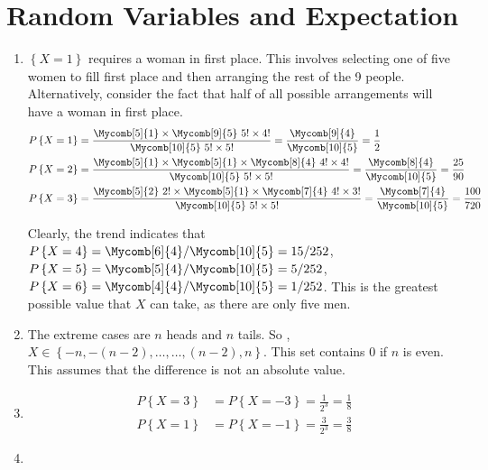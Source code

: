\chapter{Random Variables and Expectation}

\begin{enumerate}
	\item $ \left\{X = 1 \right\}$ requires a woman in first place. This involves selecting one of five women to fill first place and then arranging the rest of the 9 people. Alternatively, consider the fact that half of all possible arrangements will have a woman in first place.
	\begin{align}
		P \left\{X = 1 \right\} &= \frac{\Mycomb[5]{1} \times \Mycomb[9]{5} \ 5! \times 4!}{\Mycomb[10]{5} \ 5! \times 5!} = \frac{\Mycomb[9]{4}}{\Mycomb[10]{5}} = \frac{1}{2} \nonumber \\
		P \left\{X = 2 \right\} &= \frac{\Mycomb[5]{1} \times \Mycomb[5]{1} \times \Mycomb[8]{4}\ 4! \times 4!}{\Mycomb[10]{5} \ 5! \times 5!} = \frac{\Mycomb[8]{4}}{\Mycomb[10]{5}} = \frac{25}{90} \nonumber \\
		P \left\{X = 3 \right\} &= \frac{\Mycomb[5]{2}\ 2! \times \Mycomb[5]{1} \times \Mycomb[7]{4}\ 4! \times 3!}{\Mycomb[10]{5} \ 5! \times 5!} = \frac{\Mycomb[7]{4}}{\Mycomb[10]{5}} = \frac{100}{720}
	\end{align}
	
	Clearly, the trend indicates that \\
	$ P \left\{X = 4 \right\}  = \Mycomb[6]{4} / \Mycomb[10]{5} = 15/252$,
	$ P \left\{X = 5 \right\}  = \Mycomb[5]{4} / \Mycomb[10]{5} = 5/252$,
	$ P \left\{X = 6 \right\}  = \Mycomb[4]{4} / \Mycomb[10]{5} = 1/252$. This is the greatest possible value that $ X $ can take, as there are only five men.
	
	\item The extreme cases are $ n $ heads and $ n $ tails. So ,
	$ X \in \left\{-n, -(n-2), \dots, \dots, (n-2), n \right\} $. This set contains $ 0 $ if $ n $ is even. This assumes that the difference is not an absolute value.
	
	\item \begin{align}
		P \left\{X = 3 \right\} &= P \left\{X = -3 \right\} = \frac{1}{2^3} = \frac{1}{8} \nonumber \\
		P \left\{X = 1 \right\} &= P \left\{X = -1 \right\} = \frac{3}{2^3} = \frac{3}{8}
	\end{align}
	
	\item \begin{enumerate}
		

\end{enumerate}
\end{enumerate}
